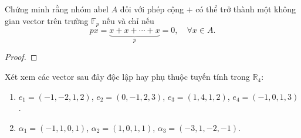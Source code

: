 \documentclass[class=linearalgebra,crop=false]{standalone}
\begin{document}
\begin{exercise}Chứng minh rằng nhóm abel $A$ đối với phép cộng $+$ có thể trở thành một không gian vector trên trường $\mathbb{F}_{p}$ nếu và chỉ nếu
    \[ px = \underbrace{x + x + \cdots + x}_{p} = 0,\quad \forall x\in A. \]
\end{exercise}

\begin{proof}
\end{proof}

\begin{exercise}Xét xem các vector sau đây độc lập hay phụ thuộc tuyến tính trong $\mathbb{R}_{4}$:
    \begin{enumerate}[label = (\alph*)]
        \item $e_{1} = (-1, -2, 1, 2)$, $e_{2} = (0, -1, 2, 3)$, $e_{3} = (1, 4, 1, 2)$, $e_{4} = (-1, 0, 1, 3)$.
        \item $\alpha_{1} = (-1, 1, 0, 1)$, $\alpha_{2} = (1, 0, 1, 1)$, $\alpha_{3} = (-3, 1, -2, -1)$.
    \end{enumerate}
\end{exercise}
\end{document}
